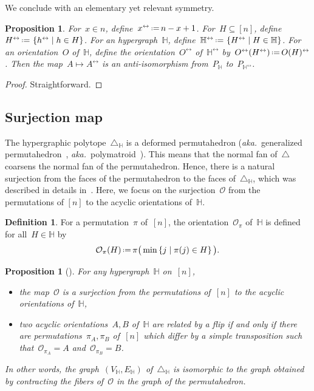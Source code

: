 \documentclass{amsart}
\newtheorem{proposition}[theorem]{Proposition}
\theoremstyle{definition}
\newtheorem{definition}[theorem]{Definition}
\newcommand{\set}[2]{\left\{ #1 \;\middle|\; #2 \right\}} %
\newcommand{\eqdef}{\mbox{\,\raisebox{0.2ex}{\scriptsize\ensuremath{\mathrm:}}\ensuremath{=}\,}} %
\newcommand{\simplex}{\triangle} %
\newcommand{\aka}{\textit{aka.}~} %
\newcommand{\Or}{\mathcal O}  %
\newcommand{\HH}{\mathbb H}  %
\begin{document}
We conclude with an elementary yet relevant symmetry.

\begin{proposition}
\label{prop:antiIsomorphism}
For~$x \in n$, define~$x^\leftrightarrow \eqdef n-x+1$.
For~$H \subseteq [n]$, define~$H^\leftrightarrow \eqdef \set{h^\leftrightarrow}{h \in H}$.
For an hypergraph~$\HH$, define~$\HH^\leftrightarrow \eqdef \set{H^\leftrightarrow}{H \in \HH}$.
For an orientation~$O$ of~$\HH$, define the orientation~$O^\leftrightarrow$ of~$\HH^\leftrightarrow$ by~$O^\leftrightarrow(H^\leftrightarrow) \eqdef O(H)^\leftrightarrow$.
Then the map~$A \mapsto A^\leftrightarrow$ is an anti-isomorphism from~$P_\HH$ to~$P_{\HH^\leftrightarrow}$.
\end{proposition}

\begin{proof}
Straightforward.
\end{proof}


\subsection{Surjection map} 
\label{subsec:surjection}

The hypergraphic polytope~$\simplex_\HH$ is a deformed permutahedron (\aka generalized permutahedron~\cite{Postnikov, PostnikovReinerWilliams}, \aka polymatroid~\cite{Edmonds}).
This means that the normal fan of~$\simplex$ coarsens the normal fan of the permutahedron.
Hence, there is a natural surjection from the faces of the permutahedron to the faces of~$\simplex_\HH$, which was described in details in~\cite[Lem.~2.9]{BenedettiBergeronMachacek}.
Here, we focus on the surjection~$\Or$ from the permutations of $[n]$ to the acyclic orientations of~$\HH$.

\begin{definition}
\label{def:surjection}
For a permutation~$\pi$ of~$[n]$, the orientation~$\Or_\pi$ of~$\HH$ is defined for all~$H \in \HH$ by
\[
\Or_\pi(H) \eqdef  \pi\big(\min\set{j}{\pi(j)\in H}\big).
\]
\end{definition}

\begin{proposition}[{\cite[Lem.~2.9]{BenedettiBergeronMachacek}}]
For any hypergraph~$\HH$ on~$[n]$,
\begin{itemize}
\item the map~$\Or$ is a surjection from the permutations of~$[n]$ to the acyclic orientations of~$\HH$,
\item two acyclic orientations~$A,B$ of~$\HH$ are related by a flip if and only if there are permutations~$\pi_A, \pi_B$ of~$[n]$ which differ by a simple transposition such that~$\Or_{\pi_A} = A$ and~$\Or_{\pi_B} = B$.
\end{itemize}
In other words, the graph~$(V_\HH, E_\HH)$ of~$\simplex_\HH$ is isomorphic to the graph obtained by contracting the fibers of~$\Or$ in the graph of the permutahedron.
\end{proposition}
\end{document}
